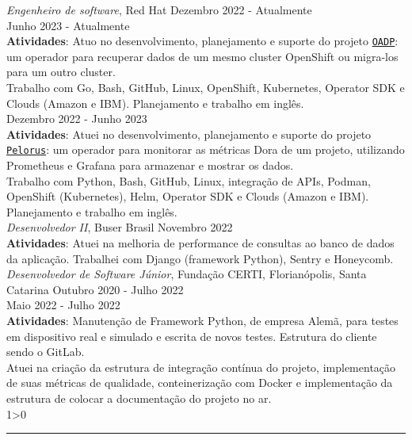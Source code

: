 \documentclass[a4paper,10pt]{article}
\newcommand{\criaSecao}[4][0]{
	\begin{tcolorbox}[
        blanker,
        breakable,
        title=\begin{minipage}{0.16\linewidth}\large{\textbf{#2}}\vspace{-#3\baselineskip}\end{minipage},
        coltitle=black,
        leftupper=0.21\linewidth,
    ]
        #4
		\ifnum0#1>0 { \hrule {\ } } \fi
    \end{tcolorbox}
}
\begin{document}
    \criaSecao[1]{Experiência}{2}{
        \textit{Engenheiro de software}, Red Hat \hfill Dezembro 2022 - Atualmente \\
        Junho 2023 - Atualmente\\
        \textbf{Atividades}: Atuo no desenvolvimento, planejamento e suporte do projeto \href{https://github.com/openshift/oadp-operator/}{\texttt{OADP}}: um operador para recuperar dados de um mesmo cluster OpenShift ou migra-los para um outro cluster.\\

        Trabalho com Go, Bash, GitHub, Linux, OpenShift, Kubernetes, Operator SDK e Clouds (Amazon e IBM). Planejamento e trabalho em inglês.\\

        Dezembro 2022 - Junho 2023\\
        \textbf{Atividades}: Atuei no desenvolvimento, planejamento e suporte do projeto \href{https://github.com/dora-metrics/pelorus/}{\texttt{Pelorus}}: um operador para monitorar as métricas Dora de um projeto, utilizando Prometheus e Grafana para armazenar e mostrar os dados.\\

        Trabalho com Python, Bash, GitHub, Linux, integração de APIs, Podman, OpenShift (Kubernetes), Helm, Operator SDK e Clouds (Amazon e IBM). Planejamento e trabalho em inglês.\\

        \textit{Desenvolvedor II}, Buser Brasil \hfill Novembro 2022 \\
        \textbf{Atividades}: Atuei na melhoria de performance de consultas ao banco de dados da aplicação. Trabalhei com Django (framework Python), Sentry e Honeycomb.\\

        \textit{Desenvolvedor de Software Júnior}, Fundação CERTI, Florianópolis, Santa Catarina \hfill Outubro 2020 - Julho 2022 \\
        Maio 2022 - Julho 2022\\
        \textbf{Atividades}: Manutenção de Framework Python, de empresa Alemã, para testes em dispositivo real e simulado e escrita de novos testes. Estrutura do cliente sendo o GitLab.\\

        Atuei na criação da estrutura de integração contínua do projeto, implementação de suas métricas de qualidade, conteinerização com Docker e implementação da estrutura de colocar a documentação do projeto no ar.\\

}
\end{document}
